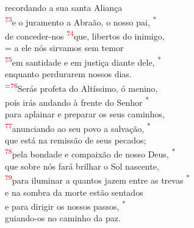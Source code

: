 \documentclass{book}
\begin{document}
\begin{center}
    recordando a sua santa Aliança
    \vspace{.2cm} \\
    \textsuperscript{\underline{\hspace{.06in}}\textcolor{red}{73}}e o juramento a Abraão, o nosso pai, \textsuperscript{*} \\
    de conceder-nos \textsuperscript{\textcolor{red}{74}}que, libertos do inimigo,
    \vspace{.2cm} \\
    = a ele nós sirvamos sem temor \dag{} \\
    \textsuperscript{\textcolor{red}{75}}em santidade e em justiça diante dele, \textsuperscript{*} \\
    enquanto perdurarem nossos dias.
    \vspace{.2cm} \\
    \textsuperscript{=\textcolor{red}{76}}Serás profeta do Altíssimo, ó menino, \dag{} \\
    pois irás andando à frente do Senhor \textsuperscript{*} \\
    para aplainar e preparar os seus caminhos,
    \vspace{.2cm} \\
    \textsuperscript{\underline{\hspace{.06in}}\textcolor{red}{77}}anunciando ao seu povo a salvação, \textsuperscript{*} \\
    que está na remissão de seus pecados;
    \vspace{.2cm} \\
    \textsuperscript{\underline{\hspace{.06in}}\textcolor{red}{78}}pela bondade e compaixão de nosso Deus, \textsuperscript{*} \\
    que sobre nós fará brilhar o Sol nascente,
    \vspace{.2cm} \\
    \textsuperscript{\underline{\hspace{.06in}}\textcolor{red}{79}}para iluminar a quantos jazem entre as trevas \textsuperscript{*} \\
    e na sombra da morte estão sentados
    \vspace{.2cm} \\
    \textsuperscript{\underline{\hspace{.06in}}} e para dirigir os nossos passos, \textsuperscript{*} \\
    guiando-os no caminho da paz.
    \vspace{.2cm} \\

\end{center}
\end{document}
